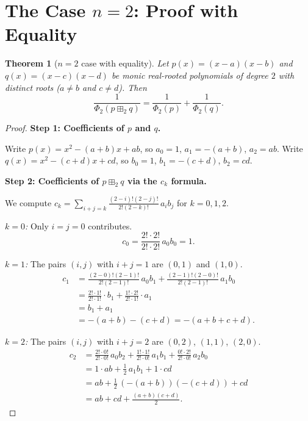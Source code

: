 \documentclass[12pt]{article}
\newtheorem{theorem}{Theorem}
\theoremstyle{definition}
\begin{document}
\section{The Case $n = 2$: Proof with Equality}

\begin{theorem}[$n=2$ case with equality]\label{thm:n2}
Let $p(x) = (x-a)(x-b)$ and $q(x) = (x-c)(x-d)$ be monic real-rooted polynomials of degree $2$ with distinct roots ($a \neq b$ and $c \neq d$). Then
\[
  \frac{1}{\Phi_2(p \boxplus_2 q)} = \frac{1}{\Phi_2(p)} + \frac{1}{\Phi_2(q)}.
\]
\end{theorem}

\begin{proof}
\textbf{Step 1: Coefficients of $p$ and $q$.}

Write $p(x) = x^2 - (a+b)x + ab$, so $a_0 = 1$, $a_1 = -(a+b)$, $a_2 = ab$.
Write $q(x) = x^2 - (c+d)x + cd$, so $b_0 = 1$, $b_1 = -(c+d)$, $b_2 = cd$.

\textbf{Step 2: Coefficients of $p \boxplus_2 q$ via the $c_k$ formula.}

We compute $c_k = \sum_{i+j=k} \frac{(2-i)!(2-j)!}{2!(2-k)!}\,a_i b_j$ for $k = 0, 1, 2$.

\medskip
\noindent\textit{$k=0$:} Only $i=j=0$ contributes.
\[
  c_0 = \frac{2!\cdot 2!}{2!\cdot 2!}\,a_0 b_0 = 1.
\]

\noindent\textit{$k=1$:} The pairs $(i,j)$ with $i+j=1$ are $(0,1)$ and $(1,0)$.
\begin{align*}
  c_1 &= \frac{(2-0)!(2-1)!}{2!(2-1)!}\,a_0 b_1 + \frac{(2-1)!(2-0)!}{2!(2-1)!}\,a_1 b_0 \\
      &= \frac{2!\cdot 1!}{2!\cdot 1!}\cdot b_1 + \frac{1!\cdot 2!}{2!\cdot 1!}\cdot a_1 \\
      &= b_1 + a_1 \\
      &= -(a+b) - (c+d) = -(a+b+c+d).
\end{align*}

\noindent\textit{$k=2$:} The pairs $(i,j)$ with $i+j=2$ are $(0,2)$, $(1,1)$, $(2,0)$.
\begin{align*}
  c_2 &= \frac{2!\cdot 0!}{2!\cdot 0!}\,a_0 b_2 + \frac{1!\cdot 1!}{2!\cdot 0!}\,a_1 b_1 + \frac{0!\cdot 2!}{2!\cdot 0!}\,a_2 b_0 \\
      &= 1 \cdot ab + \frac{1}{2}\,a_1 b_1 + 1 \cdot cd \\
      &= ab + \frac{1}{2}\,(-(a+b))(-(c+d)) + cd \\
      &= ab + cd + \frac{(a+b)(c+d)}{2}.
\end{align*}


\end{proof}
\end{document}

